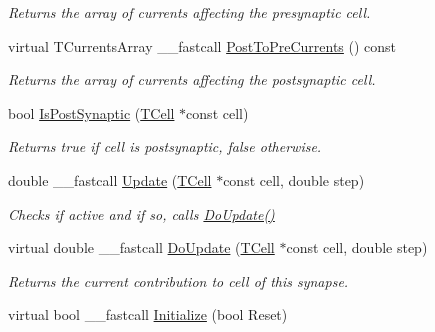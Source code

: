 \begin{DoxyCompactItemize}
\begin{DoxyCompactList}\small\item\em Returns the array of currents affecting the presynaptic cell. \end{DoxyCompactList}\item 
\hypertarget{class_t_synapse_a91a2599e699b1f911dfe90360bcc3bdb}{virtual T\+Currents\+Array \+\_\+\+\_\+fastcall \hyperlink{class_t_synapse_a91a2599e699b1f911dfe90360bcc3bdb}{Post\+To\+Pre\+Currents} () const }\label{class_t_synapse_a91a2599e699b1f911dfe90360bcc3bdb}

\begin{DoxyCompactList}\small\item\em Returns the array of currents affecting the postsynaptic cell. \end{DoxyCompactList}\item 
\hypertarget{class_t_synapse_abaf6c6a071418de34795eabd2cedf242}{bool \hyperlink{class_t_synapse_abaf6c6a071418de34795eabd2cedf242}{Is\+Post\+Synaptic} (\hyperlink{class_t_cell}{T\+Cell} $\ast$const cell)}\label{class_t_synapse_abaf6c6a071418de34795eabd2cedf242}

\begin{DoxyCompactList}\small\item\em Returns true if cell is postsynaptic, false otherwise. \end{DoxyCompactList}\item 
\hypertarget{class_t_synapse_a13c5c3233a1a1cc75f49627bc860d75f}{double \+\_\+\+\_\+fastcall \hyperlink{class_t_synapse_a13c5c3233a1a1cc75f49627bc860d75f}{Update} (\hyperlink{class_t_cell}{T\+Cell} $\ast$const cell, double step)}\label{class_t_synapse_a13c5c3233a1a1cc75f49627bc860d75f}

\begin{DoxyCompactList}\small\item\em Checks if active and if so, calls \hyperlink{class_t_synapse_a3db3cdd754f5f9536717c56e03b61b07}{Do\+Update()} \end{DoxyCompactList}\item 
virtual double \+\_\+\+\_\+fastcall \hyperlink{class_t_synapse_a3db3cdd754f5f9536717c56e03b61b07}{Do\+Update} (\hyperlink{class_t_cell}{T\+Cell} $\ast$const cell, double step)
\begin{DoxyCompactList}\small\item\em Returns the current contribution to cell of this synapse. \end{DoxyCompactList}\item 
\hypertarget{class_t_synapse_abb4e701eeab0c655c77536281c9d7fc8}{virtual bool \+\_\+\+\_\+fastcall \hyperlink{class_t_synapse_abb4e701eeab0c655c77536281c9d7fc8}{Initialize} (bool Reset)}\label{class_t_synapse_abb4e701eeab0c655c77536281c9d7fc8}


\end{DoxyCompactItemize}
